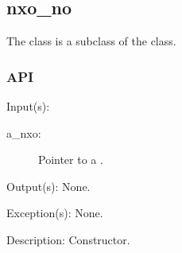 %
%
%
%
%              

\subsection{nxo\_no}
\label{nxo_no}

The  class is a subclass of the  class.

\subsubsection{API}
\begin{capi}
\label{nxo_no_new}
	\begin{capilist}
	\item[Input(s): ]
		\begin{description}\item[]
		\item[a\_nxo: ]
			Pointer to a .
		\end{description}
	\item[Output(s): ] None.
	\item[Exception(s): ] None.
	\item[Description: ]
		Constructor.
	\end{capilist}
\end{capi}
